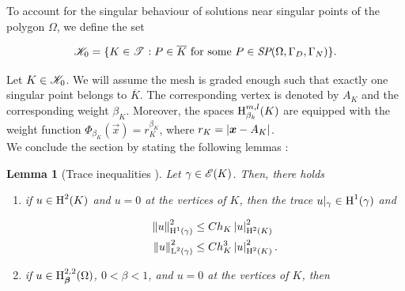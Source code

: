 \documentclass[a4paper,11pt]{article}
\newtheorem{lemma}[theorem]{Lemma}
\begin{document}
{To account for the singular behaviour of solutions near singular points of the polygon $\Omega$, we define the set

\begin{equation}
    \mathscr K_{0} = \{ K \in \mathscr T^{} : P \in \overline{K} \text{ for some } P \in \textit{SP}(\Omega,\Gamma_{D},\Gamma_{N}) \}.
\end{equation}

Let $K \in \mathscr K_{0}$. We will assume the mesh is graded enough such that exactly one singular point belongs to $\overline{K}$. The corresponding vertex is denoted by $A_{K}$ and the corresponding weight $\beta_{K}$. Moreover, the spaces $\operatorname H^{m,l}_{\beta_{k}}(K)$ are equipped with the weight function $\Phi_{\beta_{K}}(\vec{x}) = r_{K}^{\beta_{K}}$, where $r_{K} = \left|\boldsymbol x - A_{K}\right|$.
\\
We conclude the section by stating the following lemmas \cite{Wihler:2003}:

\begin{lemma}[Trace inequalities {\cite[Lemma A.2.4]{Wihler:2003}}]
\label{lemma:trace_inequality}
Let $\gamma \in \mathscr E(K)$. Then, there holds

\begin{enumerate}
    \item if $u \in \operatorname H^{2}(K)$ and $u = 0$ at the vertices of $K$, then the trace $u|_{\gamma} \in \operatorname H^{1}(\gamma)$ and
    
    \begin{equation}
    \begin{split}
    \left\|u\right\|^{2}_{\operatorname H^{1}(\gamma)} &\leq Ch_{K}\left|u\right|^{2}_{\operatorname H^{2}(K)}\\
    \left\|u\right\|^{2}_{\operatorname L^{2}(\gamma)} &\leq  C h_{K}^{3}\left|u\right|^{2}_{\operatorname H^{2}(K)}.
    \end{split}
    \end{equation}

    \item  if $u \in \operatorname H^{2,2}_{\boldsymbol \beta}(\Omega)$, $0 < \beta < 1$, and $u = 0$ at the vertices of $K$, then 


\end{enumerate}
\end{lemma}}
\end{document}
